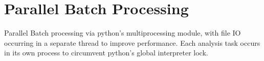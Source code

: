 \section{Parallel Batch Processing}
\label{sec:parallel}

Parallel Batch processing via python's multiprocessing module, with file IO occurring in a separate thread to improve performance.  Each analysis task occurs in its own process to circumvent python's global interpreter lock.